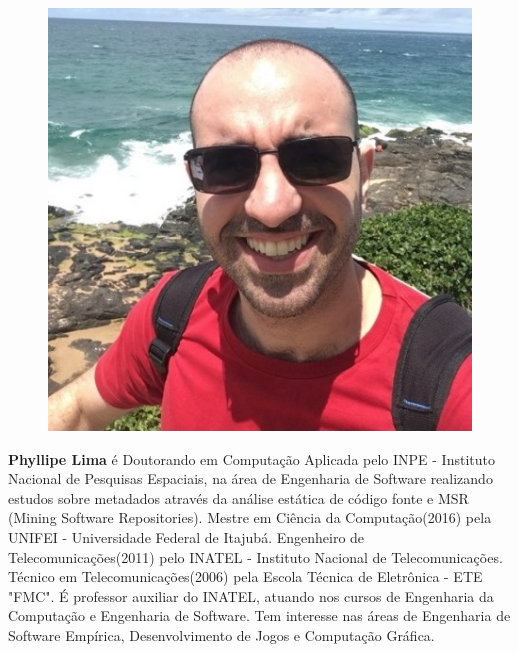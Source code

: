\begin{figure}
\includegraphics[width=\linewidth]{figuras/autor3.png}
\end{figure}

    \textbf{Phyllipe Lima} é Doutorando em Computação Aplicada pelo INPE - Instituto Nacional de Pesquisas Espaciais, na área de Engenharia de Software realizando estudos sobre metadados através da análise estática de código fonte e MSR (Mining Software Repositories). Mestre em Ciência da Computação(2016) pela UNIFEI - Universidade Federal de Itajubá. Engenheiro de Telecomunicações(2011) pelo INATEL - Instituto Nacional de Telecomunicações.  Técnico em Telecomunicações(2006) pela Escola Técnica de Eletrônica - ETE "FMC". É professor auxiliar do INATEL, atuando nos cursos de Engenharia da Computação e Engenharia de Software. Tem interesse nas áreas de Engenharia de Software Empírica, Desenvolvimento de Jogos e Computação Gráfica.


   
   
   
   
   

